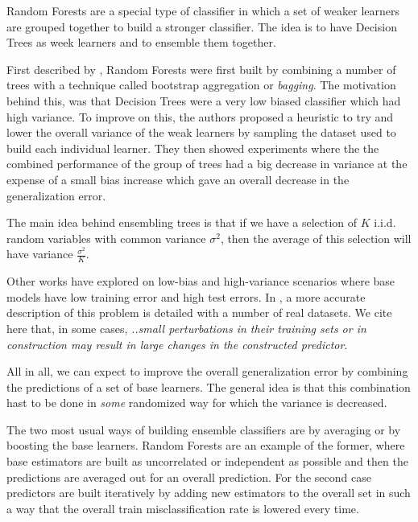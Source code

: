 \documentclass{article}%
\theoremstyle{definition}
\begin{document}
Random Forests are a special type of classifier in which a set of weaker learners are grouped together to build a stronger classifier. The idea is to have Decision Trees as week learners and to ensemble them together. 

First described by \cite{HoFirstRandomForest}, Random  Forests were first built by combining a number of trees with a technique called bootstrap aggregation or \textit{bagging}. The  motivation behind this, was that Decision Trees were a very low biased classifier which had high variance. To improve on this, the authors proposed a heuristic to try and lower the overall variance of the weak learners by sampling the dataset used to build each individual learner. They then showed experiments where the the combined performance of the group of trees had a big decrease in variance at the expense of a small bias increase which gave an overall decrease in the generalization error.

The main idea behind ensembling trees is that if we have a selection of $K$ i.i.d. random variables with common variance $\sigma^2$, then the average of this selection will have variance $\frac{\sigma^2}{K}$. 

Other works have explored on low-bias and high-variance scenarios where base models have low training error and high test errors. In \cite{breiman-arcingclassifiers}, a more accurate description of this problem is detailed with a number of real datasets. We cite here that, in some cases, \textit{..small perturbations in their  training  sets  or  in  construction  may  result  in  large  changes  in  the  constructed  predictor}.

All in all, we can expect to improve the  overall generalization error  by combining the predictions of a set of base learners. The general idea is that this combination hast to be done in  \textit{some} randomized way for which the variance is decreased.

The two most usual ways of building ensemble classifiers are by averaging or by boosting the base learners. Random Forests are an example of the former, where base estimators are built as uncorrelated or independent as possible and then the predictions are averaged out for an overall prediction. For the second case predictors are built iteratively by adding new estimators to the overall set in such a way that the overall train misclassification rate is lowered every time.
\end{document}
